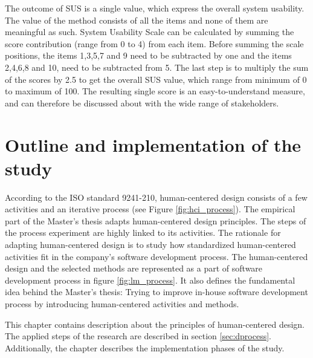 \documentclass[12pt,a4paper,oneside,pdftex]{report}
\begin{document}
The outcome of SUS is a single value, which express the overall system usability. The value of the method consists of all the items and none of them are meaningful as such. System Usability Scale can be calculated by summing the score contribution (range from 0 to 4) 		from each item. Before summing the scale positions, the items 1,3,5,7 and 9 need to be subtracted by one and the items 2,4,6,8 and 10, need to be subtracted from 5. The last step is to multiply the sum of the scores by 2.5 to get the overall SUS value, which range from minimum of 0 to maximum of 100. \citep{RefWorks:10} The resulting single score is an easy-to-understand measure, and can therefore be discussed about with the wide range of stakeholders. \citep{RefWorks:12} 
    
\chapter{Outline and implementation of the study}
\label{chapter:implementation}

According to the ISO standard 9241-210, human-centered design consists of a few activities and an iterative process (see Figure \ref{fig:hci_process}). \citep{RefWorks:40} The empirical part of the Master's thesis adapts human-centered design principles. The steps of the process experiment are highly linked to its activities. The rationale for adapting human-centered design is to study how standardized human-centered activities fit in the company's software development process. The human-centered design and the selected methods are represented as a part of software development process in figure \ref{fig:lm_process}. It also defines the fundamental idea behind the Master's thesis: Trying to improve in-house software development process by introducing human-centered activities and methods.

This chapter contains description about the principles of human-centered design. The applied steps of the research are described in section \ref{sec:dprocess}. Additionally, the chapter describes the implementation phases of the study. 
\end{document}
